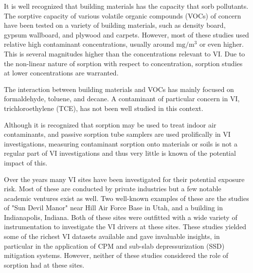 It is well recognized that building materials has the capacity that sorb pollutants.
The sorptive capacity of various volatile organic compounds (VOCs) of concern have been tested on a variety of building materials, such as density board\cite{wang_correlation_2008}, gypsum wallboard\cite{xu_determination_2012}, and plywood and carpets\cite{bodalal_method_2000}.
However, most of these studies used relative high contaminant concentrations, usually around $\mathrm{mg/m^3}$\cite{wang_correlation_2008} or even higher.
This is several magnitudes higher than the concentrations relevant to VI.
Due to the non-linear nature of sorption with respect to concentration, sorption studies at lower concentrations are warranted.\par %


The interaction between building materials and VOCs has mainly focused on  formaldehyde\cite{xu_determination_2012}, toluene, and decane\cite{bodalal_method_2000}.
A contaminant of particular concern in VI, trichloroethylene (TCE), has not been well studied in this context.


Although it is recognized that sorption may be used to treat indoor air contaminants, and passive sorption tube samplers are used prolifically in VI investigations, measuring contaminant sorption onto materials or soils is not a regular part of VI investigations and thus very little is known of the potential impact of this\cite{u.s._environmental_protection_agency_oswer_2015}.\par

Over the years many VI sites have been investigated for their potential exposure risk.
Most of these are conducted by private industries but a few notable academic ventures exist as well.
Two well-known examples of these are the studies of "Sun Devil Manor" near Hill Air Force Base in Utah, and a building in Indianapolis, Indiana.
Both of these sites were outfitted with a wide variety of instrumentation to investigate the VI drivers at these sites.
These studies yielded some of the richest VI datasets available and gave invaluable insights, in particular in the application of CPM\cite{holton_long-term_2015} and sub-slab depressurization (SSD) mitigation systems\cite{lutes_comparing_2015,u.s._environmental_protection_agency_assessment_2015}.
However, neither of these studies considered the role of sorption had at these sites.\par

